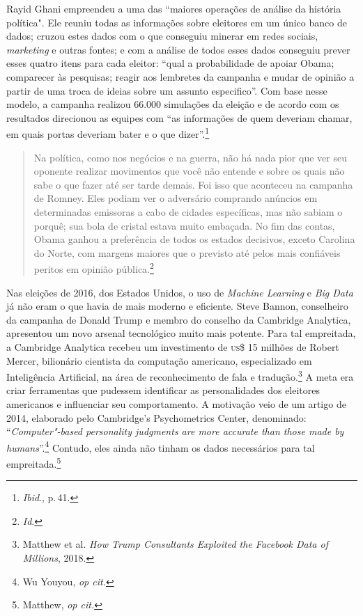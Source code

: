 Rayid Ghani empreendeu a uma das ``maiores operações de análise da
história política". Ele reuniu todas as informações sobre eleitores em
um único banco de dados; cruzou estes dados com o que conseguiu minerar
em redes sociais, \emph{marketing} e outras fontes; e com a análise de todos
esses dados conseguiu prever esses quatro itens para cada eleitor:
``qual a probabilidade de apoiar Obama; comparecer às pesquisas; reagir
aos lembretes da campanha e mudar de opinião a partir de uma troca de
ideias sobre um assunto especifico''. Com base nesse modelo, a campanha
realizou 66.000 simulações da eleição e de acordo com os resultados
direcionou as equipes com ``as informações de quem deveriam chamar, em
quais portas deveriam bater e o que dizer''.\footnote{\textit{Ibid}., p.\,41.}

\begin{quote}
Na política, como nos negócios e na guerra, não há nada pior que ver seu
oponente realizar movimentos que você não entende e sobre os quais não
sabe o que fazer até ser tarde demais. Foi isso que aconteceu na
campanha de Romney. Eles podiam ver o adversário comprando anúncios em
determinadas emissoras a cabo de cidades específicas, mas não sabiam o
porquê; sua bola de cristal estava muito embaçada. No fim das contas,
Obama ganhou a preferência de todos os estados decisivos, exceto
Carolina do Norte, com margens maiores que o previsto até pelos mais
confiáveis peritos em opinião pública.\footnote{\textit{Id}.}
\end{quote}

Nas eleições de 2016, dos Estados Unidos, o uso de \emph{Machine
Learning} e \emph{Big Data} já não eram o que havia de mais moderno e
eficiente. Steve Bannon, conselheiro da campanha de Donald Trump e
membro do conselho da Cambridge Analytica, apresentou um novo arsenal
tecnológico muito mais potente. Para tal empreitada, a Cambridge
Analytica recebeu um investimento de \textsc{us}\$ 15 milhões de Robert Mercer,
bilionário cientista da computação americano, especializado em
Inteligência Artificial, na área de reconhecimento de fala e tradução.\footnote{Matthew et al. \emph{How Trump Consultants Exploited the
Facebook Data of Millions}, 2018.} A meta era criar ferramentas que pudessem identificar as personalidades dos eleitores
americanos e influenciar seu comportamento. A motivação veio de um
artigo de 2014, elaborado pelo Cambridge's Psychometrics Center,
denominado: ``\emph{Computer"-based personality judgments are more
accurate than those made by humans}''.\footnote{Wu Youyou, \emph{op cit.}} Contudo, eles
ainda não tinham os dados necessários para tal empreitada.\footnote{Matthew, \emph{op cit.}}

